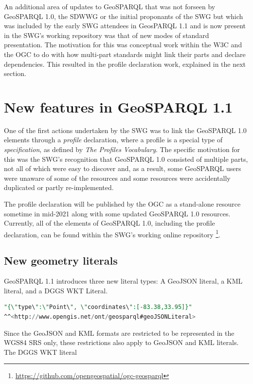 \documentclass[runningheads]{llncs}
\begin{document}
An additional area of updates to GeoSPARQL that was not forseen by GeoSPARQL 1.0, the SDWWG or the initial proponants of the SWG
but which was included by the early SWG attendees in GeosPARQL 1.1 and is now present in the SWG's working repository was that 
of new modes of standard presentation. The motivation for this was conceptual work within the W3C and the OGC to do with how 
multi-part standards might link their parts and declare dependencies. This resulted in the profile declaration work, explained 
in the next section.


\section{New features in GeoSPARQL 1.1}\label{sec:newfeatures}
One of the first actions undertaken by the SWG was to link the GeoSPARQL 1.0 elements through a \textit{profile} 
declaration, where a profile is a special type of \textit{specification}, as defined by \textit{The Profiles Vocabulary}\cite{atkinson_profiles_2020}. 
The specific motivation for this was the SWG's recognition that GeoSPARQL 1.0 consisted of multiple parts, not all
of which were easy to discover and, as a result, some GeoSPARQL users were unaware of some of the resources and some
resources were accidentally duplicated or partly re-implemented.

The profile declaration will be published by the OGC as a stand-alone resource sometime in mid-2021 along with some 
updated GeoSPARQL 1.0 resources. Currently, all of the elements of GeoSPARQL 1.0, including the profile declaration, 
can be found within the SWG's working online repository \footnote{\url{https://github.com/opengeospatial/ogc-geosparql}}.


\subsection{New geometry literals}\label{sec:literals}
GeoSPARQL 1.1 introduces three new literal types: A GeoJSON\cite{butler2016geojson} literal, a KML\cite{nolan2014keyhole} 
literal, and a DGGS\cite{sahr1998discrete} WKT Literal.

\small
\begin{lstlisting}[caption=GeoJSON literal example,label=lst:geojsonliteral,language=sql,frame=single,basicstyle=\ttfamily]
"{\"type\":\"Point\", \"coordinates\":[-83.38,33.95]}"
^^<http://www.opengis.net/ont/geosparql#geoJSONLiteral>
\end{lstlisting}
\normalsize
Since the GeoJSON and KML formats are restricted to be represented in the WGS84 SRS only, these restrictions 
also apply to GeoJSON and KML literals. The DGGS WKT literal  
\end{document}
